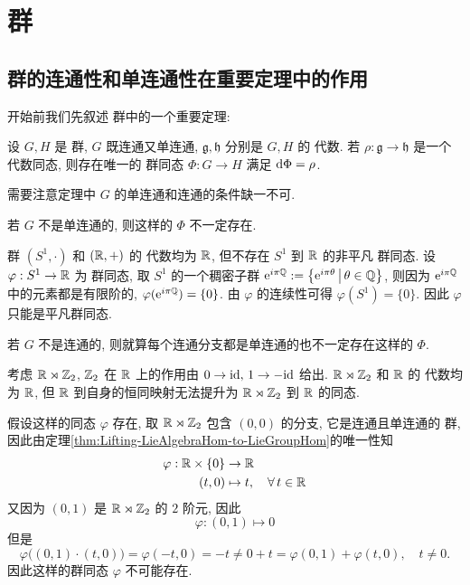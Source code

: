 \chapter{\Lie 群}
    \section{\Lie 群的连通性和单连通性在重要定理中的作用}
        开始前我们先叙述 \Lie 群中的一个重要定理:
        \begin{theorem}\label{thm:Lifting-LieAlgebraHom-to-LieGroupHom}
            设 $G,H$ 是 \Lie 群, $G$ 既连通又单连通, $\mathfrak{g},\mathfrak{h}$ 分别是 $G,H$ 的 \Lie 代数.
            若 $\rho:\mathfrak{g}\rightarrow\mathfrak{h}$ 是一个 \Lie 代数同态, 则存在唯一的 \Lie 群同态 $\Phi:G\rightarrow H$ 
            满足 ${\rm d}\Phi = \rho$.
        \end{theorem}
        需要注意定理中 $G$ 的单连通和连通的条件缺一不可.
        \begin{example}
            若 $G$ 不是单连通的, 则这样的 $\Phi$ 不一定存在.

            \Lie 群 $(S^1,\cdot)$ 和 $(\mathbb{R},+)$ 的 \Lie 代数均为 $\mathbb{R}$, 但不存在 $S^1$ 到 $\mathbb{R}$ 的非平凡 \Lie 群同态. 
            设 $\varphi:S^1\rightarrow\mathbb{R}$ 为 \Lie 群同态, 取 $S^1$ 的一个稠密子群 ${\rm e}^{i\pi\mathbb{Q}}:=\left\{{\rm e}^{i\pi\theta}\,\big|\,\theta\in\mathbb{Q}\right\}$, 
            则因为 ${\rm e}^{i\pi\mathbb{Q}}$ 中的元素都是有限阶的, $\varphi({\rm e}^{i\pi\mathbb{Q}}) = \{0\}$. 由 $\varphi$ 的连续性可得 $\varphi(S^1) = \{0\}$. 因此 $\varphi$ 只能是平凡群同态.
        \end{example}
        \begin{example}
            若 $G$ 不是连通的, 则就算每个连通分支都是单连通的也不一定存在这样的 $\Phi$.

            考虑 $\mathbb{R}\rtimes\mathbb{Z}_2$, $\mathbb{Z}_2$ 在 $\mathbb{R}$ 上的作用由 $0\rightarrow{\rm id},\,1\rightarrow-{\rm id}$ 给出. $\mathbb{R}\rtimes\mathbb{Z}_2$ 和 $\mathbb{R}$ 的 \Lie 代数均为 $\mathbb{R}$, 
            但 $\mathbb{R}$ 到自身的恒同映射无法提升为 $\mathbb{R}\rtimes\mathbb{Z}_2$ 到 $\mathbb{R}$ 的同态.

            假设这样的同态 $\varphi$ 存在, 取 $\mathbb{R}\rtimes\mathbb{Z}_2$ 包含 $(0,0)$ 的分支, 它是连通且单连通的 \Lie 群, 因此由定理{\rm\ref{thm:Lifting-LieAlgebraHom-to-LieGroupHom}}的唯一性知
            \begin{align*}
                \varphi:\mathbb{R}\times\{0\}&\rightarrow\mathbb{R} \\
                (t,0)&\mapsto t,\quad\forall\,t\in\mathbb{R}
            \end{align*}
            又因为 $(0,1)$ 是 $\mathbb{R}\rtimes\mathbb{Z}_2$ 的 $2$ 阶元, 因此 
            \begin{equation*}
                \varphi:(0,1)\mapsto 0
            \end{equation*}
            但是
            \begin{equation*}
                \varphi\Big((0,1)\cdot(t,0)\Big) = \varphi(-t,0) = -t \neq 0+t = \varphi(0,1)+\varphi(t,0),\quad t\neq0.
            \end{equation*}
            因此这样的群同态 $\varphi$ 不可能存在.
        \end{example}

